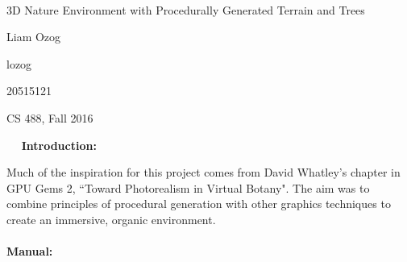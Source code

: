 \documentclass{article}
\newcommand\projecttitle{3D Nature Environment with Procedurally Generated Terrain and Trees}
\newcommand\myname{Liam Ozog}
\newcommand\myuserid{lozog}
\newcommand\mystudentid{20515121}
\newcommand\myclass{CS 488, Fall 2016}
\begin{document}
~\vfill
\begin{center}
\Large

\projecttitle

\myname

\myuserid

\mystudentid

\myclass

\end{center}
\vfill ~\vfill~
\newpage
\Large\noindent\textbf{Introduction:} \\
\normalsize

Much of the inspiration for this project comes from David Whatley's chapter in GPU Gems 2, ``Toward Photorealism in Virtual Botany". The aim was to combine principles of procedural generation with other graphics techniques to create an immersive, organic environment.
\\\\
\Large\textbf{Manual:}
\normalsize
\end{document}
